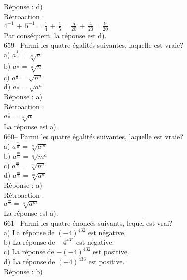 ﻿\documentclass[letterpaper, 12pt]{article}
\begin{document}
R\'eponse : d)\\

R\'etroaction : \\[2mm]
$4^{-1}\,+\,5^{-1}=\frac{1}{4}\,+\,\frac{1}{5}=\frac{5}{20}\,+\,\frac{4}{20}=\frac{9}{20}$\\[2mm]
Par cons\'equent, la r\'eponse est d).\\

659-- Parmi les quatre \'egalit\'es suivantes, laquelle est vraie?\\
a) $a^{\frac{1}{n}}=\sqrt[n]{a}$\\[2mm]
b) $a^{\frac{1}{n}}=\sqrt[a]{n}$\\[2mm]
c) $a^{\frac{1}{n}}=\sqrt{n^{a}}$\\[2mm]
d) $a^{\frac{1}{n}}=\sqrt{a^{n}}$\\

R\'eponse : a)\\

R\'etroaction : \\
$a^{\frac{1}{n}}=\sqrt[n]{a}$\\
La r\'eponse est a).\\

660-- Parmi les quatre \'egalit\'es suivantes, laquelle est vraie?\\
a) $a^{\frac{m}{n}}=\sqrt[n]{a^{m}}$\\[2mm]
b) $a^{\frac{m}{n}}=\sqrt[n]{m^{a}}$\\[2mm]
c) $a^{\frac{m}{n}}=\sqrt[m]{n^{a}}$\\[2mm]
d) $a^{\frac{m}{n}}=\sqrt[m]{a^{n}}$\\

R\'eponse : a)\\

R\'etroaction : \\
$a^{\frac{m}{n}}=\sqrt[n]{a^{m}}$\\
La r\'eponse est a).\\

661-- Parmi les quatre \'enonc\'es suivants, lequel est vrai?\\
a) La r\'eponse de $(-4)^{432}$ est n\'egative.\\
b) La r\'eponse de $-4^{432}$ est n\'egative.\\
c) La r\'eponse de $-(-4)^{432}$ est positive.\\
d) La r\'eponse de $(-4)^{433}$ est positive.\\

R\'eponse : b)\\
\end{document}
